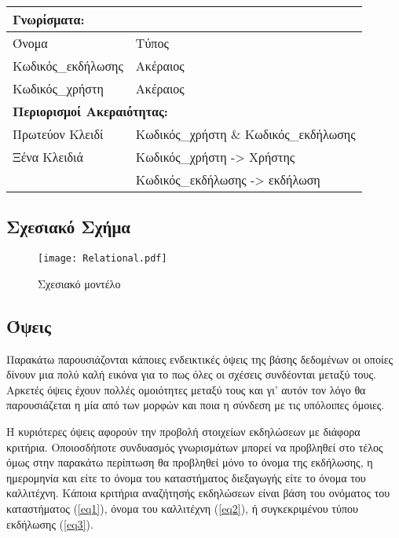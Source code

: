 \begin{tabular}{|p{6cm}|p{8cm}|}
  \multicolumn{2}{l}{\textbf{Γνωρίσματα:}}                   \\ \hline
  Όνομα              & Τύπος                                 \\ \hline
  Κωδικός\_εκδήλωσης & Ακέραιος                              \\ \hline
  Κωδικός\_χρήστη    & Ακέραιος                              \\ \hline
  \multicolumn{2}{l}{\textbf{Περιορισμοί Ακεραιότητας:}}     \\ \hline
  Πρωτεύον Κλειδί    & Κωδικός\_χρήστη \& Κωδικός\_εκδήλωσης \\ \hline
  Ξένα Κλειδιά       & Κωδικός\_χρήστη -> Χρήστης            \\ \hline
                     & Κωδικός\_εκδήλωσης -> εκδήλωση        \\ \hline
\end{tabular}

\subsection{Σχεσιακό Σχήμα}

\begin{figure}[H]
  \centering
  \texttt{[image: Relational.pdf]}
  \caption{Σχεσιακό μοντέλο}
\end{figure}

\subsection{Όψεις}

Παρακάτω παρουσιάζονται κάποιες ενδεικτικές όψεις της βάσης δεδομένων
οι οποίες δίνουν μια πολύ καλή εικόνα για το πως όλες οι σχέσεις
συνδέονται μεταξύ τους. Αρκετές όψεις έχουν πολλές ομοιότητες μεταξύ
τους και γι' αυτόν τον λόγο θα παρουσιάζεται η μία από των μορφών και
ποια η σύνδεση με τις υπόλοιπες όμοιες.

Η κυριότερες όψεις αφορούν την προβολή στοιχείων εκδηλώσεων με διάφορα
κριτήρια. Οποιοσδήποτε συνδυασμός γνωρισμάτων μπορεί να προβληθεί στο
τέλος όμως στην παρακάτω περίπτωση θα προβληθεί μόνο το όνομα της
εκδήλωσης, η ημερομηνία και είτε το όνομα του καταστήματος διεξαγωγής
είτε το όνομα του καλλιτέχνη. Κάποια κριτήρια αναζήτησής εκδηλώσεων
είναι βάση του ονόματος του καταστήματος (\ref{eq1}), όνομα του
καλλιτέχνη (\ref{eq2}), ή συγκεκριμένου τύπου εκδήλωσης (\ref{eq3}).

